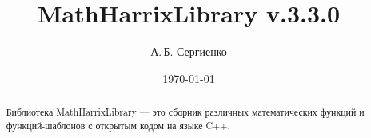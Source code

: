 \documentclass[a4paper,12pt]{article}
\title{MathHarrixLibrary v.3.3.0}
\author{А.\,Б. Сергиенко}
\date{\today}
\begin{document}


\maketitle

\begin{abstract}
Библиотека MathHarrixLibrary --- это сборник различных математических функций и функций-шаблонов с открытым кодом на языке C++.
\end{abstract}

\tableofcontents
\end{document}
